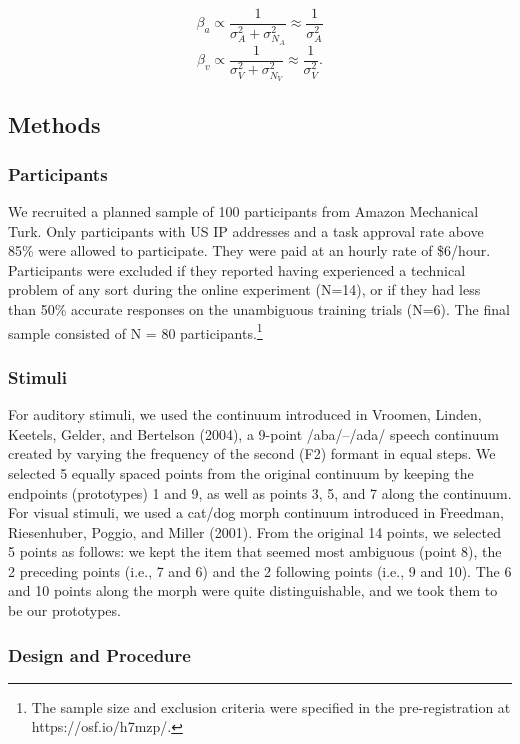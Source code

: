 \documentclass[english,floatsintext,man]{apa6}
\theoremstyle{definition}
\theoremstyle{definition}
\theoremstyle{definition}
\theoremstyle{remark}
\begin{document}
\[\beta_a \propto \frac{1}{\sigma^2_{A} + \sigma^2_{N_A}} \approx  \frac{1}{\sigma^2_{A} }\]
\[\beta_v \propto \frac{1}{\sigma^2_{V} + \sigma^2_{N_V}} \approx  \frac{1}{\sigma^2_{V} }.\]

\subsection{Methods}\label{methods}

\subsubsection{Participants}\label{participants}

We recruited a planned sample of 100 participants from Amazon Mechanical
Turk. Only participants with US IP addresses and a task approval rate
above 85\% were allowed to participate. They were paid at an hourly rate
of \$6/hour. Participants were excluded if they reported having
experienced a technical problem of any sort during the online experiment
(N=14), or if they had less than 50\% accurate responses on the
unambiguous training trials (N=6). The final sample consisted of N = 80
participants.\footnote{The sample size and exclusion criteria were specified in the pre-registration at https://osf.io/h7mzp/.}

\subsubsection{Stimuli}\label{stimuli}

For auditory stimuli, we used the continuum introduced in Vroomen,
Linden, Keetels, Gelder, and Bertelson (2004), a 9-point /aba/--/ada/
speech continuum created by varying the frequency of the second (F2)
formant in equal steps. We selected 5 equally spaced points from the
original continuum by keeping the endpoints (prototypes) 1 and 9, as
well as points 3, 5, and 7 along the continuum. For visual stimuli, we
used a cat/dog morph continuum introduced in Freedman, Riesenhuber,
Poggio, and Miller (2001). From the original 14 points, we selected 5
points as follows: we kept the item that seemed most ambiguous (point
8), the 2 preceding points (i.e., 7 and 6) and the 2 following points
(i.e., 9 and 10). The 6 and 10 points along the morph were quite
distinguishable, and we took them to be our prototypes.

\subsubsection{Design and Procedure}\label{design-and-procedure}
\end{document}
